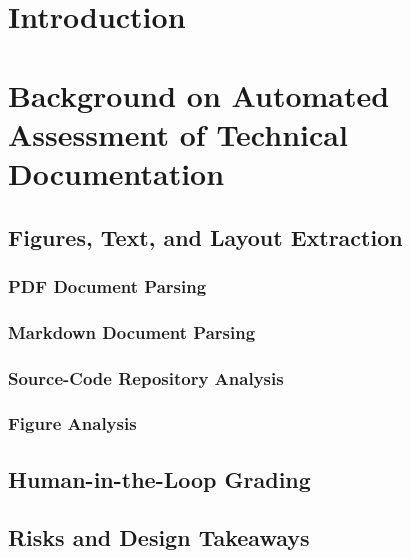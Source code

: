 
\chapter{Introduction}\label{ch:intro}

\chapter{Background on Automated Assessment of Technical Documentation}\label{ch:background}

\section{Figures, Text, and Layout Extraction}\label{sec:extraction}
\subsection*{PDF Document Parsing}\label{subsec:doc-parsing-pdf}
\subsection*{Markdown Document Parsing}\label{subsec:doc-parsing-markdown}
\subsection*{Source-Code Repository Analysis}\label{subsec:source-code-analysis}
\subsection*{Figure Analysis}\label{subsec:figure-analysis}

\section{Human-in-the-Loop Grading}\label{sec:hitl}

\section{Risks and Design Takeaways}\label{sec:risks}


